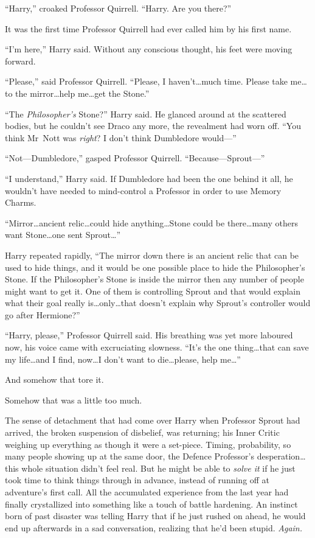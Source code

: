 “Harry,” croaked Professor Quirrell.
“Harry. Are you there?”

It was the first time Professor Quirrell had ever called him by his first name.

“I’m here,” Harry said. Without any conscious thought, his feet were moving forward.

“Please,” said Professor Quirrell.
“Please, I haven’t…much time. Please take me…to the mirror…help me…get the Stone.”

“The \emph{Philosopher’s} Stone?” Harry said. He glanced around at the scattered bodies, but he couldn’t see Draco any more, the revealment had worn off.
“You think Mr~Nott was \emph{right}? I don’t think Dumbledore would—”

“Not—Dumbledore,” gasped Professor Quirrell.
“Because—Sprout—”

“I understand,” Harry said. If Dumbledore had been the one behind it all, he wouldn’t have needed to mind-control a Professor in order to use Memory Charms.

“Mirror…ancient relic…could hide anything…Stone could be there…many others want Stone…one sent Sprout…”

Harry repeated rapidly,
“The mirror down there is an ancient relic that can be used to hide things, and it would be one possible place to hide the Philosopher’s Stone. If the Philosopher’s Stone is inside the mirror then any number of people might want to get it. One of them is controlling Sprout and that would explain what their goal really is…only…that doesn’t explain why Sprout’s controller would go after Hermione?”

“Harry, please,” Professor Quirrell said. His breathing was yet more laboured now, his voice came with excruciating slowness.
“It’s the one thing…that can save my life…and I find, now…I don’t want to die…please, help me…”

And somehow that tore it.

Somehow that was a little too much.

The sense of detachment that had come over Harry when Professor Sprout had arrived, the broken suspension of disbelief, was returning; his Inner Critic weighing up everything as though it were a set-piece. Timing, probability, so many people showing up at the same door, the Defence Professor’s desperation…this whole situation didn’t feel real. But he might be able to \emph{solve it} if he just took time to think things through in advance, instead of running off at adventure’s first call. All the accumulated experience from the last year had finally crystallized into something like a touch of battle hardening. An instinct born of past disaster was telling Harry that if he just rushed on ahead, he would end up afterwards in a sad conversation, realizing that he’d been stupid. \emph{Again.}

